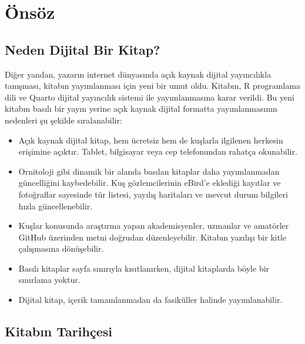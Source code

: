 \documentclass[
  a4paper,
  DIV=11,
  numbers=noendperiod]{scrreprt}
\begin{document}
\markright{}


\chapter*{Önsöz}\label{uxf6nsuxf6z}


\section*{Neden Dijital Bir Kitap?}\label{neden-dijital-bir-kitap}


Diğer yandan, yazarın internet dünyasında açık kaynak dijital
yayıncılıkla tanışması, kitabın yayımlanması için yeni bir umut oldu.
Kitabın, R programlama dili ve Quarto dijital yayıncılık sistemi ile
yayımlanmasına karar verildi. Bu yeni kitabın basılı bir yayın yerine
açık kaynak dijital formatta yayımlanmasının nedenleri şu şekilde
sıralanabilir:

\begin{itemize}
\item
  Açık kaynak dijital kitap, hem ücretsiz hem de kuşlarla ilgilenen
  herkesin erişimine açıktır. Tablet, bilgisayar veya cep telefonundan
  rahatça okunabilir.
\item
  Ornitoloji gibi dinamik bir alanda basılan kitaplar daha yayımlanmadan
  güncelliğini kaybedebilir. Kuş gözlemcilerinin eBird'e eklediği
  kayıtlar ve fotoğraflar sayesinde tür listesi, yayılış haritaları ve
  mevcut durum bilgileri hızla güncellenebilir.
\item
  Kuşlar konusunda araştırma yapan akademisyenler, uzmanlar ve amatörler
  GitHub üzerinden metni doğrudan düzenleyebilir. Kitabın yazılışı bir
  kitle çalışmasına dönüşebilir.
\item
  Basılı kitaplar sayfa sınırıyla kısıtlanırken, dijital kitaplarda
  böyle bir sınırlama yoktur.
\item
  Dijital kitap, içerik tamamlanmadan da fasiküller halinde
  yayımlanabilir.
\end{itemize}

\section*{Kitabın Tarihçesi}\label{kitabux131n-tarihuxe7esi}
\end{document}
